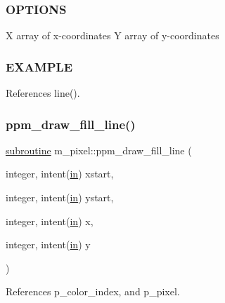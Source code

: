 \subsubsection*{O\+P\+T\+I\+O\+NS}

X array of x-\/coordinates Y array of y-\/coordinates

\subsubsection*{E\+X\+A\+M\+P\+LE}

References line().

\mbox{\label{namespacem__pixel_a6f75bc951acd07267e0841ca5985d8b7}} 
\subsubsection{\texorpdfstring{ppm\+\_\+draw\+\_\+fill\+\_\+line()}{ppm\_draw\_fill\_line()}}
{\footnotesize\ttfamily \hyperlink{M__stopwatch_83_8txt_acfbcff50169d691ff02d4a123ed70482}{subroutine} m\+\_\+pixel\+::ppm\+\_\+draw\+\_\+fill\+\_\+line (\begin{DoxyParamCaption}\item[{integer, intent(\hyperlink{M__journal_83_8txt_afce72651d1eed785a2132bee863b2f38}{in})}]{xstart,  }\item[{integer, intent(\hyperlink{M__journal_83_8txt_afce72651d1eed785a2132bee863b2f38}{in})}]{ystart,  }\item[{integer, intent(\hyperlink{M__journal_83_8txt_afce72651d1eed785a2132bee863b2f38}{in})}]{x,  }\item[{integer, intent(\hyperlink{M__journal_83_8txt_afce72651d1eed785a2132bee863b2f38}{in})}]{y }\end{DoxyParamCaption})\hspace{0.3cm}{\ttfamily [private]}}



References p\+\_\+color\+\_\+index, and p\+\_\+pixel.

\mbox{\label{namespacem__pixel_a1629b7134d0ea4b0f301ca23df764b8e}} 
